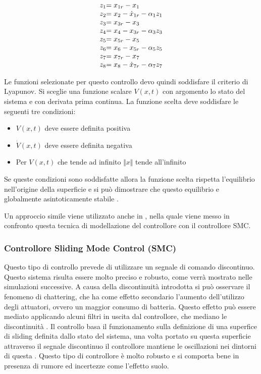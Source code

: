 \begin{equation}\label{eq:SistemaQuadrirotore-BACKERR}
	\begin{array}{r@{}l}
		z_1 & = x_{1r} -x_1 \\
		z_2 & = x_2 - \dot{x}_{1r} - \alpha_1 z_1 \\
		z_3 & = x_{3r} - x_3 \\
		z_4 & = x_4 - x_{3r} - \alpha_3 z_3 \\
		z_5 & = x_{5r} -x_5 \\
		z_6 & = x_6 - x_{5r} - \alpha_5 z_5 \\
		z_7 &= x_{7r} - x_7 \\
		z_8 &= x_8 - \dot{x}_{7r} - \alpha_7 z_7
	\end{array}
\end{equation}

Le funzioni selezionate per questo controllo devo quindi soddisfare il criterio di Lyapunov. Si sceglie una funzione scalare $V(x,t)$ con argomento lo stato del sistema e con derivata prima continua. La funzione scelta deve soddisfare le seguenti tre condizioni:
\begin{itemize}
	\item $V(x,t)$ deve essere definita positiva
	\item $\dot{V}(x,t)$ deve essere definita negativa
	\item Per $V(x,t)$ che tende ad infinito $\Vert x \Vert$ tende all'infinito
\end{itemize}
Se queste condizioni sono soddisfatte allora la funzione scelta rispetta l'equilibrio nell'origine della superficie e si può dimostrare che questo equilibrio e globalmente asintoticamente stabile \cite{DesTestCarm}.

Un approccio simile viene utilizzato anche in \cite{Backstepping1}, nella quale viene messo in confronto questa tecnica di modellazione del controllore con il controllore SMC.

\subsubsection{Controllore Sliding Mode Control (SMC)}

Questo tipo di controllo prevede di utilizzare un segnale di comando discontinuo. Questo sistema risulta essere molto preciso e robusto, come verrà mostrato nelle simulazioni successive. A causa della discontinuità introdotta si può  osservare il fenomeno di chattering, che ha come effetto secondario l'aumento dell'utilizzo degli attuatori, ovvero un maggior consumo di batteria. Questo effetto può essere mediato applicando alcuni filtri in uscita dal controllore, che mediano le discontinuità \cite{KimJinho2020ACSo}. Il controllo basa il funzionamento sulla definizione di una superfice di sliding definita dallo stato del sistema, una volta portato su questa superficie attraverso il segnale discontinuo il controllore mantiene le oscillazioni nei dintorni di questa \cite{DesTestCarm}. Questo tipo di controllore è molto robusto e si comporta bene in presenza di rumore ed incertezze come l'effetto suolo.

